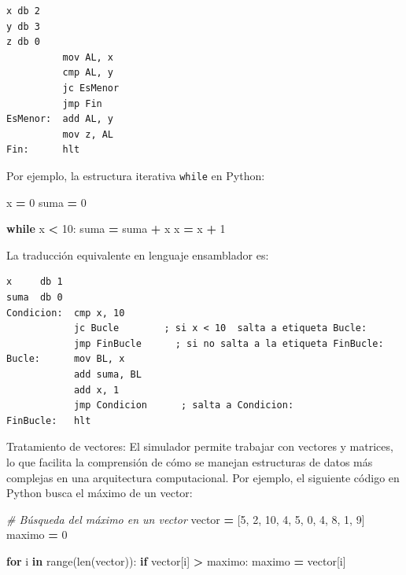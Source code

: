 \documentclass[12pt,oneside]{templates/unerthesis}
\newenvironment{Shaded}{\begin{snugshade}}{\end{snugshade}}
\newcommand{\BuiltInTok}[1]{#1}
\newcommand{\CommentTok}[1]{\textcolor[rgb]{0.56,0.35,0.01}{\textit{#1}}}
\newcommand{\ControlFlowTok}[1]{\textcolor[rgb]{0.13,0.29,0.53}{\textbf{#1}}}
\newcommand{\DecValTok}[1]{\textcolor[rgb]{0.00,0.00,0.81}{#1}}
\newcommand{\KeywordTok}[1]{\textcolor[rgb]{0.13,0.29,0.53}{\textbf{#1}}}
\newcommand{\NormalTok}[1]{#1}
\newcommand{\OperatorTok}[1]{\textcolor[rgb]{0.81,0.36,0.00}{\textbf{#1}}}
\begin{document}
\begin{lstlisting}
x db 2 
y db 3
z db 0
          mov AL, x
          cmp AL, y
          jc EsMenor
          jmp Fin
EsMenor:  add AL, y
          mov z, AL 
Fin:      hlt\end{lstlisting}

Por ejemplo, la estructura iterativa \texttt{while} en Python:

\begin{Shaded}
\begin{Highlighting}[]
\NormalTok{x }\OperatorTok{=} \DecValTok{0}
\NormalTok{suma }\OperatorTok{=} \DecValTok{0}

\ControlFlowTok{while}\NormalTok{ x }\OperatorTok{\textless{}} \DecValTok{10}\NormalTok{:}
\NormalTok{    suma }\OperatorTok{=}\NormalTok{ suma }\OperatorTok{+}\NormalTok{ x}
\NormalTok{    x }\OperatorTok{=}\NormalTok{ x }\OperatorTok{+} \DecValTok{1}
\end{Highlighting}
\end{Shaded}

La traducción equivalente en lenguaje ensamblador es:

\begin{lstlisting}
x     db 1   
suma  db 0   
Condicion:  cmp x, 10 
            jc Bucle        ; si x < 10  salta a etiqueta Bucle:
            jmp FinBucle      ; si no salta a la etiqueta FinBucle:
Bucle:      mov BL, x
            add suma, BL
            add x, 1
            jmp Condicion      ; salta a Condicion:
FinBucle:   hlt
\end{lstlisting}

Tratamiento de vectores: El simulador permite trabajar con vectores y matrices, lo que facilita la comprensión de cómo se manejan estructuras de datos más complejas en una arquitectura computacional. Por ejemplo, el siguiente código en Python busca el máximo de un vector:

\begin{Shaded}
\begin{Highlighting}[]
\CommentTok{\# Búsqueda del máximo en un vector}
\NormalTok{vector }\OperatorTok{=}\NormalTok{ [}\DecValTok{5}\NormalTok{, }\DecValTok{2}\NormalTok{, }\DecValTok{10}\NormalTok{, }\DecValTok{4}\NormalTok{, }\DecValTok{5}\NormalTok{, }\DecValTok{0}\NormalTok{, }\DecValTok{4}\NormalTok{, }\DecValTok{8}\NormalTok{, }\DecValTok{1}\NormalTok{, }\DecValTok{9}\NormalTok{]}
\NormalTok{maximo }\OperatorTok{=} \DecValTok{0}

\ControlFlowTok{for}\NormalTok{ i }\KeywordTok{in} \BuiltInTok{range}\NormalTok{(}\BuiltInTok{len}\NormalTok{(vector)):}
    \ControlFlowTok{if}\NormalTok{ vector[i] }\OperatorTok{\textgreater{}}\NormalTok{ maximo:}
\NormalTok{        maximo }\OperatorTok{=}\NormalTok{ vector[i]}
\end{Highlighting}
\end{Shaded}
\end{document}
